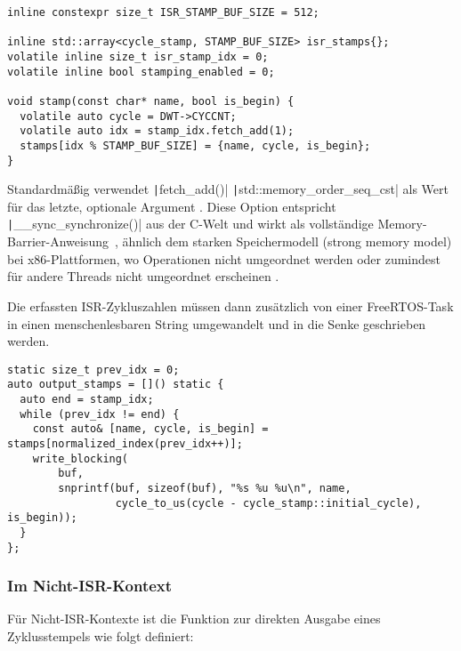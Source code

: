 \begin{code}
\begin{verbatim}
inline constexpr size_t ISR_STAMP_BUF_SIZE = 512;

inline std::array<cycle_stamp, STAMP_BUF_SIZE> isr_stamps{};
volatile inline size_t isr_stamp_idx = 0;
volatile inline bool stamping_enabled = 0;

void stamp(const char* name, bool is_begin) {
  volatile auto cycle = DWT->CYCCNT;
  volatile auto idx = stamp_idx.fetch_add(1);
  stamps[idx % STAMP_BUF_SIZE] = {name, cycle, is_begin};
}
\end{verbatim}
\end{code}

Standardmäßig verwendet \texttt|fetch_add()|
\texttt|std::memory_order_seq_cst| als Wert für das letzte, optionale
Argument \cite{cppreference_fetch_add}. Diese Option entspricht
\texttt|__sync_synchronize()| aus der C-Welt und wirkt als vollständige
Memory-Barrier-Anweisung~\cite{cppreference_memory_order}, ähnlich dem starken
Speichermodell (strong memory model) bei x86-Plattformen, wo Operationen nicht
umgeordnet werden oder zumindest für andere Threads nicht umgeordnet
erscheinen \cite{memory_ordering}.

Die erfassten ISR-Zykluszahlen müssen dann zusätzlich von einer FreeRTOS-Task in
einen menschenlesbaren String umgewandelt und in die Senke geschrieben werden.

\begin{code}
    \begin{verbatim}
static size_t prev_idx = 0;
auto output_stamps = []() static {
  auto end = stamp_idx;
  while (prev_idx != end) {
    const auto& [name, cycle, is_begin] = stamps[normalized_index(prev_idx++)];
    write_blocking(
        buf,
        snprintf(buf, sizeof(buf), "%s %u %u\n", name,
                 cycle_to_us(cycle - cycle_stamp::initial_cycle), is_begin));
  }
};
    \end{verbatim}
\end{code}

\subsubsection{Im Nicht-ISR-Kontext}

Für Nicht-ISR-Kontexte ist die Funktion zur direkten Ausgabe eines
Zyklusstempels wie folgt definiert:

